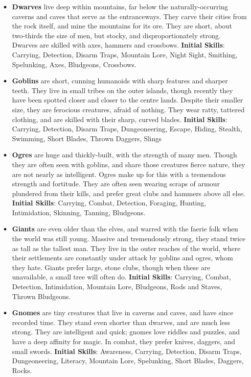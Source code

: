 \begin{itemize}
\item {\bf Dwarves} live deep within mountains, far below the 
naturally-occurring caverns and caves that serve as the entranceways.  They
carve their cities from the rock itself, and mine the mountains for its 
ore.  They are short, about two-thirds the size of men, but stocky, and 
disproportionately strong.  Dwarves are skilled with axes, hammers and 
crossbows. \textbf{Initial Skills}: Carrying, Detection, Disarm Traps,
Mountain Lore, Night Sight, Smithing, Spelunking, Axes, Bludgeons,
Crossbows.

\item {\bf Goblins} are short, cunning humanoids with sharp features and 
sharper teeth.  They live in small tribes on the outer islands, though 
recently they have been spotted closer and closer to the centre lands.   
Despite their smaller size, they are ferocious creatures, afraid of 
nothing.  They wear ratty, tattered clothing, and are skilled with their 
sharp, curved blades. \textbf{Initial Skills}: Carrying, Detection,
Disarm Traps, Dungeoneering, Escape, Hiding, Stealth, Swimming, Short
Blades, Thrown Daggers, Slings

\item {\bf Ogres} are huge and thickly-built, with the strength of many 
men.  Though they are often seen with goblins, and share those creatures 
fierce nature, they are not nearly as intelligent.  Ogres make up for this 
with a tremendous strength and fortitude.  They are often seen wearing 
scraps of armour plundered from their kills, and prefer great clubs and 
hammers above all else. \textbf{Initial Skills}: Carrying, Combat,
Detection, Foraging, Hunting, Intimidation, Skinning, Tanning, Bludgeons.

\item {\bf Giants} are even older than the elves, and warred with the 
faerie folk when the world was still young.  Massive and tremendously 
strong, they stand twice as tall as the tallest man.  They live in the 
outer reaches of the world, where their settlements are constantly under 
attack by goblins and ogres, whom they hate. Giants prefer large, stone 
clubs, though when these are unavailable, a small tree will often do.
\textbf{Initial Skills}: Carrying, Combat, Detection, Intimidation,
Mountain Lore, Bludgeons, Rods and Staves, Thrown Bludgeons.

\item {\bf Gnomes} are tiny creatures that live in caverns and caves, and 
have since recorded time.  They stand even shorter than dwarves, and are 
much less strong.  They are intelligent and quick; gnomes love riddles and 
puzzles, and have a deep affinity for magic.  In combat, they prefer knives,
daggers, and small swords. \textbf{Initial Skills}: Awareness, Carrying,
Detection, Disarm Traps, Dungeoneering, Literacy, Mountain Lore, Spelunking,
Short Blades, Daggers, Rocks.
\end{itemize}

